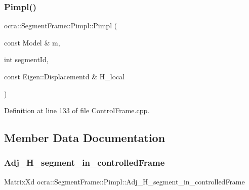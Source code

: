 \hypertarget{structocra_1_1SegmentFrame_1_1Pimpl_a6bc146a3436c88655f79afd8bf7a46b3}{}\label{structocra_1_1SegmentFrame_1_1Pimpl_a6bc146a3436c88655f79afd8bf7a46b3} 
\subsubsection{\texorpdfstring{Pimpl()}{Pimpl()}\hspace{0.1cm}{\footnotesize\ttfamily [4/4]}}
{\footnotesize\ttfamily ocra\+::\+Segment\+Frame\+::\+Pimpl\+::\+Pimpl (\begin{DoxyParamCaption}\item[{const Model \&}]{m,  }\item[{int}]{segment\+Id,  }\item[{const Eigen\+::\+Displacementd \&}]{H\+\_\+local }\end{DoxyParamCaption})\hspace{0.3cm}{\ttfamily [inline]}}



Definition at line 133 of file Control\+Frame.\+cpp.



\subsection{Member Data Documentation}
\hypertarget{structocra_1_1SegmentFrame_1_1Pimpl_a3b188df19a7b138373a1861dfa5aad1d}{}\label{structocra_1_1SegmentFrame_1_1Pimpl_a3b188df19a7b138373a1861dfa5aad1d} 
\subsubsection{\texorpdfstring{Adj\+\_\+\+H\+\_\+segment\+\_\+in\+\_\+controlled\+Frame}{Adj\_H\_segment\_in\_controlledFrame}}
{\footnotesize\ttfamily Matrix\+Xd ocra\+::\+Segment\+Frame\+::\+Pimpl\+::\+Adj\+\_\+\+H\+\_\+segment\+\_\+in\+\_\+controlled\+Frame}



